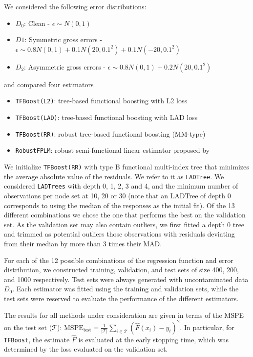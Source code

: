 We considered the following error distributions: 

\begin{itemize}
 \setlength\itemsep{0em}
\item $D_0$: Clean - $\epsilon \sim N(0,1)$
\item $D1$: Symmetric gross errors - $\epsilon \sim 0.8 N(0,1) + 0.1 N(20,0.1^2) + 0.1 N(-20, 0.1^2)$ 
\item $D_2$: Asymmetric gross errors - $\epsilon \sim 0.8 N(0,1) + 0.2 N(20,0.1^2)$ 
\end{itemize}
and compared four estimators 
\begin{itemize}
\itemsep0em 
\item \texttt{TFBoost(L2)}: tree-based functional boosting with L2 loss
\item \texttt{TFBoost(LAD)}: tree-based functional boosting with LAD loss
\item \texttt{TFBoost(RR)}: robust tree-based functional boosting (MM-type)
\item \texttt{RobustFPLM}: robust semi-functional linear estimator proposed by \cite{boente2020robust}
\end{itemize}
We initialize \texttt{TFBoost(RR)} with type B functional multi-index tree that minimizes the average absolute value of the residuals. We refer to it as \texttt{LADTree}.  We considered \texttt{LADTrees} with depth 0, 1, 2, 3 and 4, and the minimum number of observations per node set at 10, 20 or 30 (note that an LADTree of depth 0 corresponds to using the median of the responses as the initial fit). Of the 13 different combinations we chose the one that performs the best on the validation set. As the validation set may also contain outliers, we first fitted a depth 0 tree and trimmed as potential outliers those observations with residuals deviating from their median by more than 3 times their MAD.


For each of the 12 possible combinations of the regression function and error distribution, we constructed training, validation, and test sets of size 400, 200, and 1000 respectively.   Test sets were always generated with uncontaminated data $D_0$. Each estimator was fitted using the training and validation sets, while the test sets were reserved to evaluate the performance of the different estimators.   

The results for all methods under consideration are given in terms of the MSPE on the test set ($\mathcal{T}$): $\text{MSPE}_{\text{test}} = \frac{1}{|\mathcal{T}|} \sum_{i \in \mathcal{T}} (\hat{F}(x_i) - y_i)^2$.  In particular, for \texttt{TFBoost}, the estimate $\hat{F}$ is evaluated at the early stopping time, which was determined by the loss evaluated on the validation set.  

